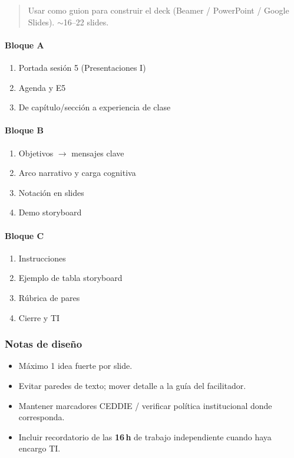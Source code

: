 \begin{quote}
Usar como guion para construir el deck (Beamer / PowerPoint / Google Slides). $\sim$16--22 slides.
\end{quote}

\paragraph{Bloque A}\begin{enumerate}
\item Portada sesión 5 (Presentaciones I)
\item Agenda y E5
\item De capítulo/sección a experiencia de clase
\end{enumerate}
\paragraph{Bloque B}\begin{enumerate}
\item Objetivos $\rightarrow$ mensajes clave
\item Arco narrativo y carga cognitiva
\item Notación en slides
\item Demo storyboard
\end{enumerate}
\paragraph{Bloque C}\begin{enumerate}
\item Instrucciones
\item Ejemplo de tabla storyboard
\item Rúbrica de pares
\item Cierre y TI
\end{enumerate}

\subsubsection*{Notas de diseño}
\begin{itemize}
\item Máximo 1 idea fuerte por slide.
\item Evitar paredes de texto; mover detalle a la guía del facilitador.
\item Mantener marcadores CEDDIE / verificar política institucional donde corresponda.
\item Incluir recordatorio de las \textbf{16\,h} de trabajo independiente cuando haya encargo TI.
\end{itemize}
